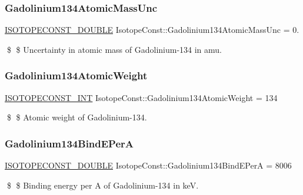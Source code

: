 \subsubsection{\texorpdfstring{Gadolinium134\+Atomic\+Mass\+Unc}{Gadolinium134AtomicMassUnc}}
{\footnotesize\ttfamily \mbox{\hyperlink{group___isotope_const-_macros_ga8f45a7272ce02c0b4c65c44636ed719a}{I\+S\+O\+T\+O\+P\+E\+C\+O\+N\+S\+T\+\_\+\+D\+O\+U\+B\+LE}} Isotope\+Const\+::\+Gadolinium134\+Atomic\+Mass\+Unc = 0.}

\$ \$ Uncertainty in atomic mass of Gadolinium-\/134 in amu. \mbox{\label{group___isotope_const-_gadolinium-_gd134_ga09762e5098f2624f48c3bb1018b0ecf3}} 
\subsubsection{\texorpdfstring{Gadolinium134\+Atomic\+Weight}{Gadolinium134AtomicWeight}}
{\footnotesize\ttfamily \mbox{\hyperlink{group___isotope_const-_macros_ga5f18360b3e99483a35c32d789e62621c}{I\+S\+O\+T\+O\+P\+E\+C\+O\+N\+S\+T\+\_\+\+I\+NT}} Isotope\+Const\+::\+Gadolinium134\+Atomic\+Weight = 134}

\$ \$ Atomic weight of Gadolinium-\/134. \mbox{\label{group___isotope_const-_gadolinium-_gd134_ga1d6f3b1afa9dd2c1abeace3d82446557}} 
\subsubsection{\texorpdfstring{Gadolinium134\+Bind\+E\+PerA}{Gadolinium134BindEPerA}}
{\footnotesize\ttfamily \mbox{\hyperlink{group___isotope_const-_macros_ga8f45a7272ce02c0b4c65c44636ed719a}{I\+S\+O\+T\+O\+P\+E\+C\+O\+N\+S\+T\+\_\+\+D\+O\+U\+B\+LE}} Isotope\+Const\+::\+Gadolinium134\+Bind\+E\+PerA = 8006}

\$ \$ Binding energy per A of Gadolinium-\/134 in keV. \mbox{\label{group___isotope_const-_gadolinium-_gd134_gaa9d91c4be0411a2c70c545694a6252c0}} 

